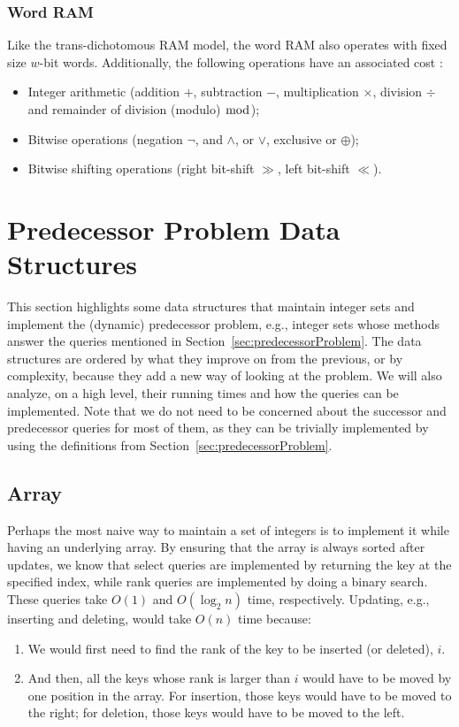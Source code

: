 \subsubsection{Word RAM} \label{sec:wordRAM}
Like the trans-dichotomous RAM model, the word RAM also operates with fixed size $w$-bit words. Additionally, the following operations have an associated cost \cite{nelsonjelanilec1}:
\begin{itemize}
    \item Integer arithmetic (addition $+$, subtraction $-$, multiplication $\times$, division $\div$ and remainder of division (modulo) $\bmod$);
    \item Bitwise operations (negation $\neg$, and $\wedge$, or $\vee$, exclusive or $\oplus$);
    \item Bitwise shifting operations (right bit-shift $\gg$, left bit-shift $\ll$).
\end{itemize}

\newpage
\section{Predecessor Problem Data Structures} \label{sec:IntegerSets}

This section highlights some data structures that maintain integer sets and implement the (dynamic) predecessor problem, e.g., integer sets whose methods answer the queries mentioned in Section~\ref{sec:predecessorProblem}.
The data structures are ordered by what they improve on from the previous, or by complexity, because they add a new way of looking at the problem.
We will also analyze, on a high level, their running times and how the queries can be implemented.
Note that we do not need to be concerned about the successor and predecessor queries for most of them, as they can be trivially implemented by using the definitions from Section~\ref{sec:predecessorProblem}.

\subsection{Array} \label{sec:array}

Perhaps the most naive way to maintain a set of integers is to implement it while having an underlying array. By ensuring that the array is always sorted after updates, we know that select queries are implemented by returning the key at the specified index, while rank queries are implemented by doing a binary search. These queries take $O(1)$ and $O(\log_2 n)$ time, respectively. Updating, e.g., inserting and deleting, would take $O(n)$ time because:
\begin{enumerate}
    \item
    We would first need to find the rank of the key to be inserted (or deleted), $i$.
    
    \item
    And then, all the keys whose rank is larger than $i$ would have to be moved by one position in the array. For insertion, those keys would have to be moved to the right; for deletion, those keys would have to be moved to the left.
\end{enumerate}

